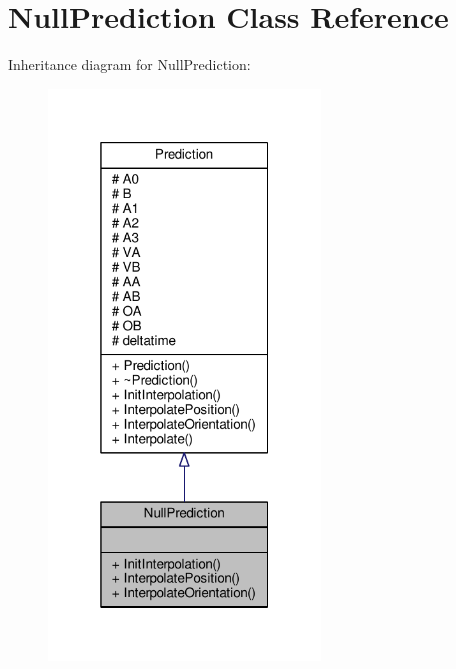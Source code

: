 \hypertarget{classNullPrediction}{}\section{Null\+Prediction Class Reference}
\label{classNullPrediction}


Inheritance diagram for Null\+Prediction\+:
\nopagebreak
\begin{figure}[H]
\begin{center}
\leavevmode
\includegraphics[width=205pt]{d2/d14/classNullPrediction__inherit__graph}
\end{center}
\end{figure}


